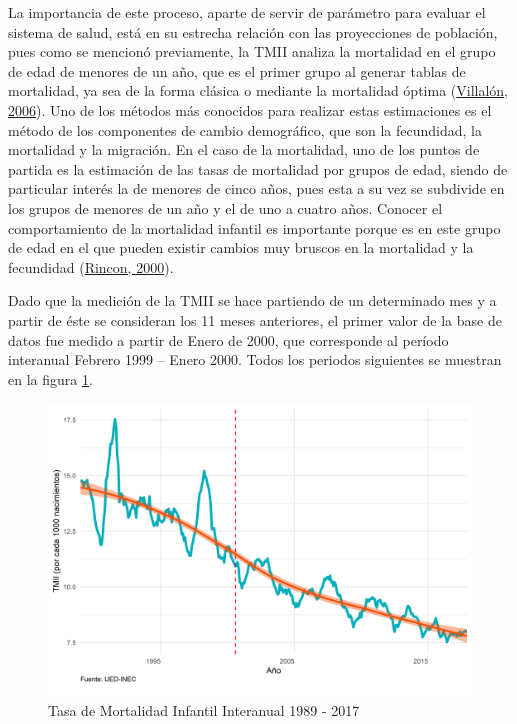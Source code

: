 \documentclass[
]{article}
\begin{document}
La importancia de este proceso, aparte de servir de parámetro para
evaluar el sistema de salud, está en su estrecha relación con las
proyecciones de población, pues como se mencionó previamente, la TMII
analiza la mortalidad en el grupo de edad de menores de un año, que es
el primer grupo al generar tablas de mortalidad, ya sea de la forma
clásica o mediante la mortalidad óptima
(\protect\hyperlink{ref-mortalidad_optima}{Villalón, 2006}). Uno de los
métodos más conocidos para realizar estas estimaciones es el método de
los componentes de cambio demográfico, que son la fecundidad, la
mortalidad y la migración. En el caso de la mortalidad, uno de los
puntos de partida es la estimación de las tasas de mortalidad por grupos
de edad, siendo de particular interés la de menores de cinco años, pues
esta a su vez se subdivide en los grupos de menores de un año y el de
uno a cuatro años. Conocer el comportamiento de la mortalidad infantil
es importante porque es en este grupo de edad en el que pueden existir
cambios muy bruscos en la mortalidad y la fecundidad
(\protect\hyperlink{ref-Rincon}{Rincon, 2000}).

Dado que la medición de la TMII se hace partiendo de un determinado mes
y a partir de éste se consideran los 11 meses anteriores, el primer
valor de la base de datos fue medido a partir de Enero de 2000, que
corresponde al período interanual Febrero 1999 -- Enero 2000. Todos los
periodos siguientes se muestran en la figura \ref{fig:tmiiplotgeneral}.

\begin{figure}[H]
\includegraphics[width=1\linewidth,height=1\textheight]{Tesis_files/figure-latex/tmiiplotgeneral-1} \caption{Tasa de Mortalidad Infantil Interanual 1989 - 2017}\label{fig:tmiiplotgeneral}
\end{figure}
\end{document}
